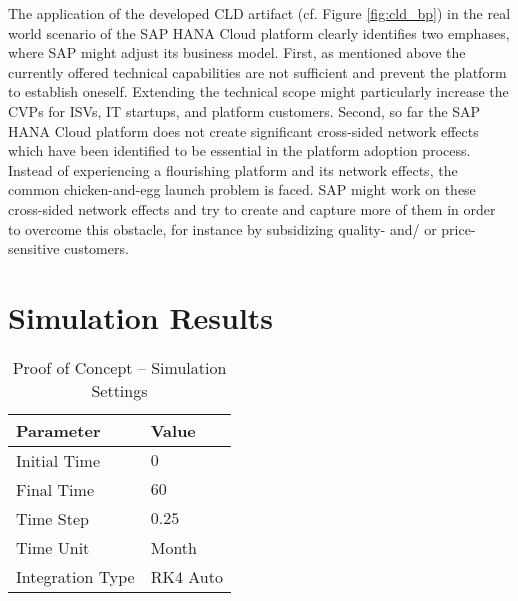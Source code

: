 The application of the developed \ac{CLD} artifact (cf. Figure \ref{fig:cld_bp}) in the real world scenario of the SAP HANA Cloud platform clearly identifies two emphases, where SAP might adjust its business model. First, as mentioned above the currently offered technical capabilities are not sufficient and prevent the platform to establish oneself. Extending the technical scope might particularly increase the \acp{CVP} for \acp{ISV}, \ac{IT} startups, and platform customers. Second, so far the SAP HANA Cloud platform does not create significant cross-sided network effects which have been identified to be essential in the platform adoption process. Instead of experiencing a flourishing platform and its network effects, the common chicken-and-egg launch problem is faced. SAP might work on these cross-sided network effects and try to create and capture more of them in order to overcome this obstacle, for instance by subsidizing quality- and/ or price-sensitive customers.

\section{Simulation Results}\label{ch:poc:sr}

\begin{table}[t]
	\centering
	\begin{tabular}{ll}
		\toprule 
		\footnotesize \textbf{Parameter} & \footnotesize \textbf{Value} \\ \midrule
		\footnotesize Initial Time & $0$ \\
		\footnotesize Final Time & $60$ \\
		\footnotesize Time Step & $0.25$ \\
		\footnotesize Time Unit & \footnotesize Month \\ \midrule
		\footnotesize Integration Type & \footnotesize RK4 Auto\footnotemark \\ \bottomrule
	\end{tabular}
	\caption{Proof of Concept -- Simulation Settings}
	\label{tab:tb}
\end{table}


